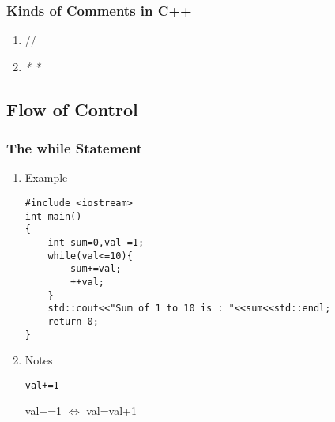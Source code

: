 \documentclass[11pt]{article}
\begin{document}
\subsubsection{Kinds of Comments in C++}
\label{sec-1-3-1}
\begin{enumerate}
\item //
\item \emph{*    *}
\end{enumerate}
\subsection{Flow of Control}
\label{sec-1-4}
\subsubsection{The while Statement}
\label{sec-1-4-1}
\begin{enumerate}
\item Example
\label{sec-1-4-1-1}
\begin{verbatim}
#include <iostream>
int main()
{
    int sum=0,val =1;
    while(val<=10){
        sum+=val;
        ++val;
    }
    std::cout<<"Sum of 1 to 10 is : "<<sum<<std::endl;
    return 0;
}
\end{verbatim}
\item Notes
\label{sec-1-4-1-2}
\begin{verbatim}
val+=1
\end{verbatim}
val+=1 $\Leftrightarrow$  val=val+1
\end{enumerate}
\end{document}
